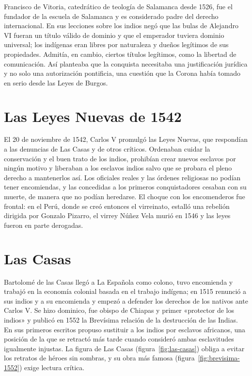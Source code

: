 \documentclass{book}
\begin{document}
Francisco de Vitoria, catedrático de teología de Salamanca desde 1526, fue el fundador de la escuela de Salamanca y es considerado padre del derecho internacional. En sus lecciones sobre los indios negó que las bulas de Alejandro VI fueran un título válido de dominio y que el emperador tuviera dominio universal; los indígenas eran libres por naturaleza y dueños legítimos de sus propiedades. Admitía, en cambio, ciertos títulos legítimos, como la libertad de comunicación. Así planteaba que la conquista necesitaba una justificación jurídica y no solo una autorización pontificia, una cuestión que la Corona había tomado en serio desde las Leyes de Burgos.


\section{Las Leyes Nuevas de 1542}

El 20 de noviembre de 1542, Carlos V promulgó las Leyes Nuevas, que respondían a las denuncias de Las Casas y de otros críticos. Ordenaban cuidar la conservación y el buen trato de los indios, prohibían crear nuevos esclavos por ningún motivo y liberaban a los esclavos indios salvo que se probara el pleno derecho a mantenerlos así. Los oficiales reales y las órdenes religiosas no podían tener encomiendas, y las concedidas a los primeros conquistadores cesaban con su muerte, de manera que no podían heredarse. El choque con los encomenderos fue frontal: en el Perú, donde se creó entonces el virreinato, estalló una rebelión dirigida por Gonzalo Pizarro, el virrey Núñez Vela murió en 1546 y las leyes fueron en parte derogadas.


\section{Las Casas}

Bartolomé de las Casas llegó a La Española como colono, tuvo encomienda y trabajó en la economía colonial basada en el trabajo indígena; en 1515 renunció a sus indios y a su encomienda y empezó a defender los derechos de los nativos ante Carlos V. Se hizo dominico, fue obispo de Chiapas y primer «protector de los indios» y publicó en 1552 la Brevísima relación de la destrucción de las Indias. En sus primeros escritos propuso sustituir a los indios por esclavos africanos, una posición de la que se retractó más tarde cuando consideró ambas esclavitudes igualmente injustas. La figura de Las Casas (figura~\ref{fig:las-casas}) obliga a evitar los retratos de héroes sin sombras, y su obra más famosa (figura~\ref{fig:brevisima-1552}) exige lectura crítica.
\end{document}
